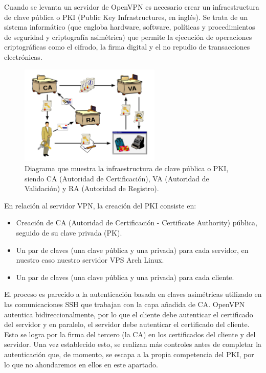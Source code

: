\documentclass[a4paper, 11pt, titlepage]{article}
\begin{document}
        Cuando se levanta un servidor de OpenVPN es necesario crear un infraestructura de clave pública o PKI (Public Key Infrastructures, en inglés). Se trata de un 
        sistema informático (que engloba hardware, software, políticas y procedimientos de seguridad y criptografía asimétrica) que permite la ejecución de operaciones
        criptográficas como el cifrado, la firma digital y el no repudio de transacciones electrónicas.

        \begin{figure}[htp]
            \centering
            \includegraphics[width=0.6\textwidth]{resources/ca01.png}
            \caption{Diagrama que muestra la infraestructura de clave pública o PKI, siendo CA (Autoridad de Certificación), VA (Autoridad de Validación) y RA (Autoridad de
            Registro).}
            \label{tuntap02}
        \end{figure}

        En relación al servidor VPN, la creación del PKI consiste en:

        \begin{itemize}
            \item Creación de CA (Autoridad de Certificación - Certificate Authority) pública, seguido de su clave privada (PK).
            \item Un par de claves (una clave pública y una privada) para cada servidor, en nuestro caso nuestro servidor VPS Arch Linux.
            \item Un par de claves (una clave pública y una privada) para cada cliente.
        \end{itemize}

        El proceso es parecido a la autenticación basada en claves asimétricas utilizado en las comunicaciones SSH que trabajan con la capa añadida de CA. OpenVPN autentica 
        bidireccionalmente, por lo que el cliente debe autenticar el certificado del servidor y en paralelo, el servidor debe autenticar el certificado del cliente. 
        Esto se logra por la firma del tercero (la CA) en los certificados del cliente y del servidor. Una vez establecido esto, se realizan más controles antes de completar
        la autenticación que, de momento, se escapa a la propia competencia del PKI, por lo que no ahondaremos en ellos en este apartado. 
\end{document}
